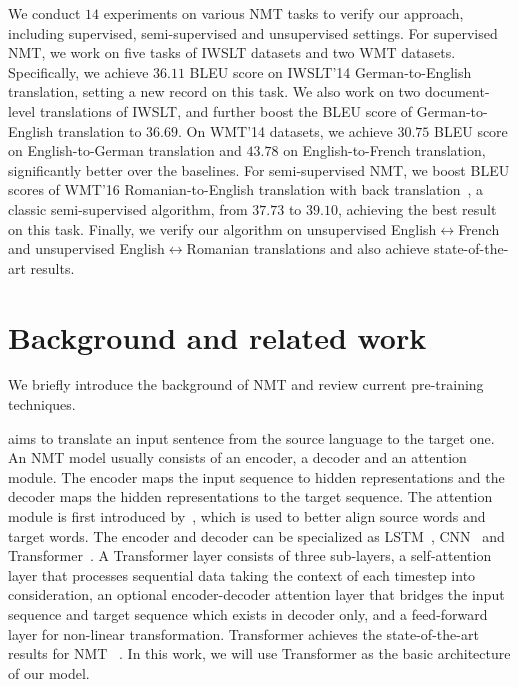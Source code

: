 \documentclass{article} \usepackage{iclr2020_conference,times}
\begin{document}
We conduct $14$ experiments on various NMT tasks to verify our approach, including supervised, semi-supervised and unsupervised settings. For supervised NMT, we work on five tasks of IWSLT datasets and two WMT datasets. Specifically, we achieve $36.11$ BLEU score on IWSLT'14 German-to-English translation, setting a new record on this task. We also work on two document-level translations of IWSLT, and further boost the BLEU score of German-to-English translation to $36.69$. On WMT'14 datasets, we achieve $30.75$ BLEU score on English-to-German translation and $43.78$ on English-to-French translation, significantly better over the baselines. For semi-supervised NMT, we boost BLEU scores of WMT'16 Romanian-to-English translation with back translation~\citep{sennrich2016improving}, a classic semi-supervised algorithm, from $37.73$ to $39.10$, achieving the best result on this task. Finally, we verify our algorithm on unsupervised English$\leftrightarrow$French and unsupervised English$\leftrightarrow$Romanian translations and also achieve state-of-the-art results. 




\section{Background and related work}
\label{sec:related_work}
We briefly introduce the background of NMT and review current pre-training techniques.

 aims to translate an input sentence from the source language to the target one. An NMT model usually consists of an encoder, a decoder and an attention module. The encoder maps the input sequence to hidden representations and the decoder maps the hidden representations to the target sequence. The attention module is first introduced by~\cite{bahdanau2014neural}, which is used to better align source words and target words. The encoder and decoder can be specialized as LSTM~\citep{Hochreiter:1997:LSM:1246443.1246450,sutskever2014sequence,wu2016google}, CNN~\citep{gehring2017convolutional} and Transformer~\citep{vaswani2017attention}. A Transformer layer consists of three sub-layers, a self-attention layer that processes sequential data taking the context of each timestep into consideration, an optional encoder-decoder attention layer that bridges the input sequence and target sequence which exists in decoder only, and a feed-forward layer for non-linear transformation. Transformer achieves the state-of-the-art results for NMT ~\citep{barrault-EtAl:2019:WMT}. In this work, we will use Transformer as the basic architecture of our model.
\end{document}

